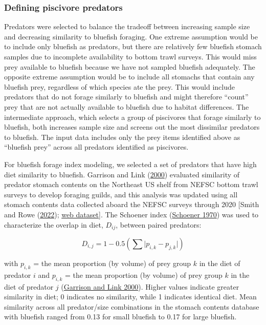 \documentclass[
]{article}
\begin{document}
\hypertarget{defining-piscivore-predators}{%
\subsubsection{Defining piscivore predators}\label{defining-piscivore-predators}}

Predators were selected to balance the tradeoff between increasing sample size and decreasing similarity to bluefish foraging. One extreme assumption would be to include only bluefish as predators, but there are relatively few bluefish stomach samples due to incomplete availability to bottom trawl surveys. This would miss prey available to bluefish because we have not sampled bluefish adequately. The opposite extreme assumption would be to include all stomachs that contain any bluefish prey, regardless of which species ate the prey. This would include predators that do not forage similarly to bluefish and might therefore ``count'' prey that are not actually available to bluefish due to habitat differences. The intermediate approach, which selects a group of piscivores that forage similarly to bluefish, both increases sample size and screens out the most dissimilar predators to bluefish. The input data includes only the prey items identified above as ``bluefish prey'' across all predators identified as piscivores.

For bluefish forage index modeling, we selected a set of predators that have high diet similarity to bluefish. Garrison and Link (\protect\hyperlink{ref-garrison_dietary_2000}{2000}) evaluated similarity of predator stomach contents on the Northeast US shelf from NEFSC bottom trawl surveys to develop foraging guilds, and this analysis was updated using all stomach contents data collected aboard the NEFSC surveys through 2020 {[}Smith and Rowe (\protect\hyperlink{ref-smith_fish_2022}{2022}); \href{https://fwdp.shinyapps.io/tm2020/\#4_DIET_OVERLAP_AND_TROPHIC_GUILDS}{web dataset}{]}. The Schoener index (\protect\hyperlink{ref-schoener_nonsynchronous_1970}{Schoener 1970}) was used to characterize the overlap in diet, \(D_{ij}\), between paired predators:

\[ D_{i,j} = 1-0.5 (\sum \lvert p_{i,k}-p_{j,k} \rvert) \]

with \(p_{i,k}\) = the mean proportion (by volume) of prey group \(k\) in the diet of predator \(i\) and \(p_{i,k}\) = the mean proportion (by volume) of prey group \(k\) in the diet of predator \(j\) (\protect\hyperlink{ref-garrison_dietary_2000}{Garrison and Link 2000}). Higher values indicate greater similarity in diet; 0 indicates no similarity, while 1 indicates identical diet. Mean similarity across all predator/size combinations in the stomach contents database with bluefish ranged from 0.13 for small bluefish to 0.17 for large bluefish.
\end{document}
